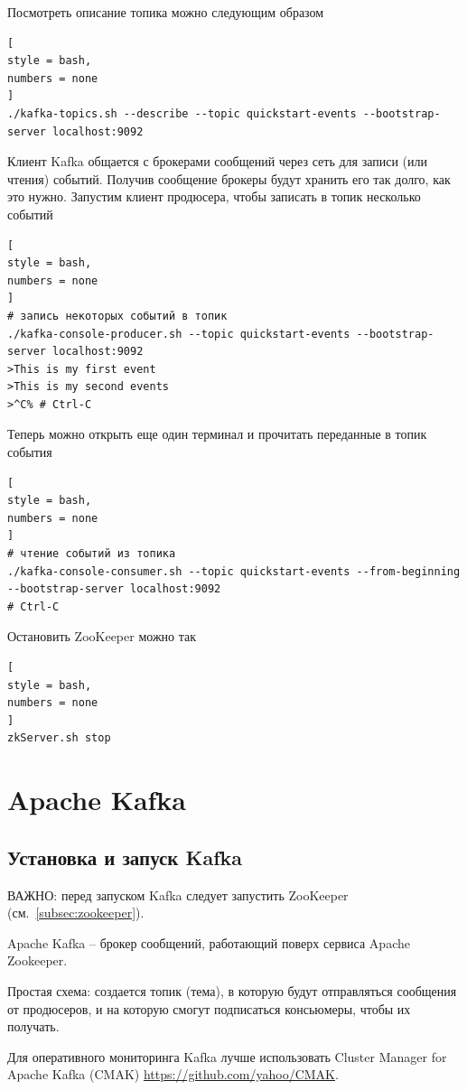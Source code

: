 \documentclass[%
	11pt,
	a4paper,
	utf8,
		]{article}
\begin{document}
Посмотреть описание топика можно следующим образом
\begin{lstlisting}[
style = bash,
numbers = none	
]
./kafka-topics.sh --describe --topic quickstart-events --bootstrap-server localhost:9092
\end{lstlisting}

Клиент Kafka общается с брокерами сообщений через сеть для записи (или чтения) событий. Получив сообщение брокеры будут хранить его так долго, как это нужно. Запустим клиент продюсера, чтобы записать в топик несколько событий
\begin{lstlisting}[
style = bash,
numbers = none	
]
# запись некоторых событий в топик
./kafka-console-producer.sh --topic quickstart-events --bootstrap-server localhost:9092
>This is my first event
>This is my second events
>^C% # Ctrl-C
\end{lstlisting}

Теперь можно открыть еще один терминал и прочитать переданные в топик события
\begin{lstlisting}[
style = bash,
numbers = none
]
# чтение событий из топика
./kafka-console-consumer.sh --topic quickstart-events --from-beginning --bootstrap-server localhost:9092
# Ctrl-C
\end{lstlisting}

Остановить ZooKeeper можно так
\begin{lstlisting}[
style = bash,
numbers = none	
]
zkServer.sh stop
\end{lstlisting}




\section{Apache Kafka}\label{sec:kafka}

\subsection{Установка и запуск Kafka}

ВАЖНО: перед запуском Kafka следует запустить ZooKeeper (см.~\ref{subsec:zookeeper}).

Apache Kafka -- брокер сообщений, работающий поверх сервиса Apache Zookeeper.

Простая схема: создается топик (тема), в которую будут отправляться сообщения от продюсеров, и на которую смогут подписаться консьюмеры, чтобы их получать.

Для оперативного мониторинга Kafka лучше использовать Cluster Manager for Apache Kafka (CMAK) \url{https://github.com/yahoo/CMAK}.
\end{document}
